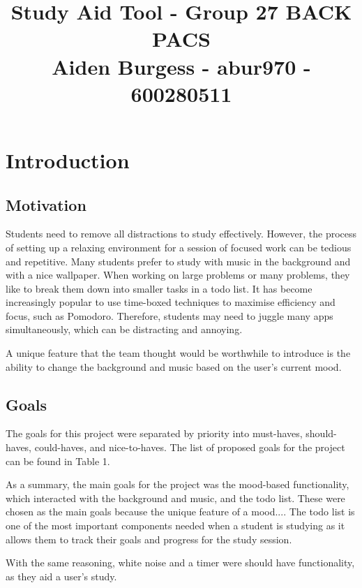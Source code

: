 \documentclass[conference]{IEEEtran}
\begin{document}
\title{Study Aid Tool - Group 27 BACK PACS \\
{\large Aiden Burgess - abur970 - 600280511}
}
\maketitle
\begin{abstract}

\end{abstract}

\section{Introduction}


\subsection{Motivation}
Students need to remove all distractions to study effectively. However, the process of setting up a relaxing environment for a session of focused work can be tedious and repetitive. Many students prefer to study with music in the background and with a nice wallpaper. When working on large problems or many problems, they like to break them down into smaller tasks in a todo list. It has become increasingly popular to use time-boxed techniques to maximise efficiency and focus, such as Pomodoro. Therefore, students may need to juggle many apps simultaneously, which can be distracting and annoying.

A unique feature that the team thought would be worthwhile to introduce is the ability to change the background and music based on the user's current mood.

\subsection{Goals}
The goals for this project were separated by priority into must-haves, should-haves, could-haves, and nice-to-haves. The list of proposed goals for the project can be found in Table 1.

As a summary, the main goals for the project was the mood-based functionality, which interacted with the background and music, and the todo list. These were chosen as the main goals because the unique feature of a mood.... The todo list is one of the most important components needed when a student is studying as it allows them to track their goals and progress for the study session.

With the same reasoning, white noise and a timer were should have functionality, as they aid a user's study.
\end{document}
